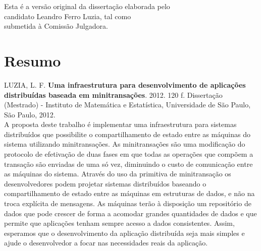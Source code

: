 \documentclass[11pt,twoside,a4paper]{book}
\begin{document}
    \vskip 2cm

    \begin{flushright}
	Esta é a versão original da dissertação elaborada pelo\\
	candidato Leandro Ferro Luzia, tal como \\
	submetida à Comissão Julgadora.
    \end{flushright}

\pagebreak



\chapter*{Resumo}

\noindent LUZIA, L. F. \textbf{Uma infraestrutura para desenvolvimento de aplicações distribuídas baseada em minitransações}. 
2012. 120 f.
Dissertação (Mestrado) - Instituto de Matemática e Estatística,
Universidade de São Paulo, São Paulo, 2012.
\\

A proposta deste trabalho é implementar uma infraestrutura para sistemas distribuídos que possibilite o compartilhamento de estado entre as máquinas do sistema utilizando minitransações. As minitransações são uma modificação do protocolo de efetivação de duas fases em que todas as operações que compõem a transação são enviadas de uma só vez, diminuindo o custo de comunicação entre as máquinas do sistema. Através do uso da primitiva de minitransação os desenvolvedores podem projetar sistemas distribuídos baseando o compartilhamento de estado entre as máquinas em estruturas de dados, e não na troca explícita de mensagens. As máquinas terão à disposição um repositório de dados que pode crescer de forma a acomodar grandes quantidades de dados e que permite que aplicações tenham sempre acesso a dados consistentes. Assim, esperamos que o desenvolvimento da aplicação distribuída seja mais simples e ajude o desenvolvedor a focar nas necessidades reais da aplicação.
\\
\end{document}
